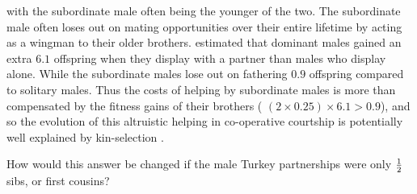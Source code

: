 with the subordinate male often being the younger of the two. The
subordinate male often loses out on mating opportunities over their
entire lifetime by acting as a wingman to their older 
brothers. \citet{krakauer2005kin} estimated that dominant males gained
an extra $6.1$ offspring when they display with a partner than males
who display alone. While the subordinate males lose out on fathering $0.9$
offspring compared to solitary males. Thus the costs of helping by
subordinate males is more than compensated by the fitness gains of
their brothers ( $ (2 \times 0.25)  \times 6.1 > 0.9$), and so the
evolution of this  altruistic  helping in co-operative courtship is potentially well explained by kin-selection \citep[see ][for more analysis]{akccay2016}.
\begin{question}
How would this answer be changed if the male Turkey partnerships were only
$\nicefrac{1}{2}$ sibs, or first cousins?
\end{question}


